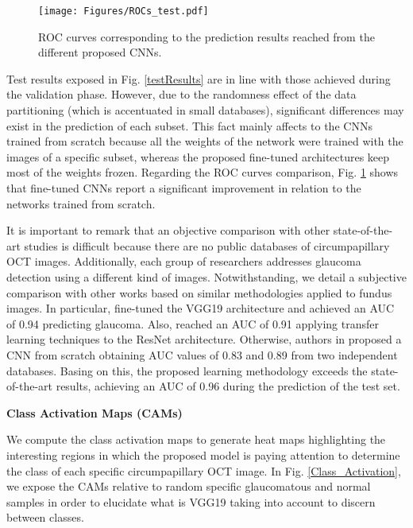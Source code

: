 \begin{figure}[h]
\begin{center}
\texttt{[image: Figures/ROCs\_test.pdf]} \\
\end{center}
\caption{ROC curves corresponding to the prediction results reached from the different proposed CNNs.}
\label{testROCs}
\end{figure}


Test results exposed in Fig. \ref{testResults} are in line with those achieved during the validation phase. However, due to the randomness effect of the data partitioning (which is accentuated in small databases), significant differences may exist in the prediction of each subset. This fact mainly affects to the CNNs trained from scratch because all the weights of the network were trained with the images of a specific subset, whereas the proposed fine-tuned architectures keep most of the weights frozen. Regarding the ROC curves comparison, Fig. \ref{testROCs} shows that fine-tuned CNNs report a significant improvement in relation to the networks trained from scratch.


It is important to remark that an objective comparison with other state-of-the-art studies is difficult because there are no public databases of circumpapillary OCT images. Additionally, each group of researchers addresses glaucoma detection using a different kind of images. Notwithstanding, we detail a subjective comparison with other works based on similar methodologies applied to fundus images. In particular, \cite{gomez2019automatic} fine-tuned the VGG19 architecture and achieved an AUC of 0.94 predicting glaucoma. Also, \cite{christopher2018performance} reached an AUC of 0.91 applying transfer learning techniques to the ResNet architecture. Otherwise, authors in \cite{chen2015glaucoma} proposed a CNN from scratch obtaining AUC values of 0.83 and 0.89 from two independent databases. Basing on this, the proposed learning methodology exceeds the state-of-the-art results, achieving an AUC of 0.96 during the prediction of the test set. 



\BlankLine
\textbf{Class Activation Maps (CAMs)}

We compute the class activation maps to generate heat maps highlighting the interesting regions in which the proposed model is paying attention to determine the class of each specific circumpapillary OCT image. In Fig. \ref{Class_Activation}, we expose the CAMs relative to random specific glaucomatous and normal samples in order to elucidate what is VGG19 taking into account to discern between classes. 



